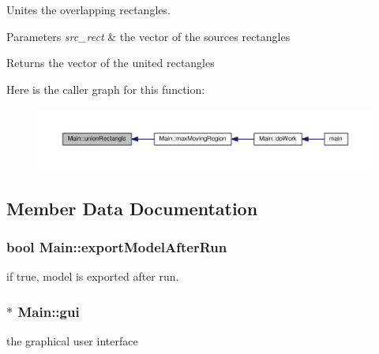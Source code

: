 Unites the overlapping rectangles. 


\begin{DoxyParams}{Parameters}
{\em src\-\_\-rect} & the vector of the sources rectangles \\
\hline
\end{DoxyParams}
\begin{DoxyReturn}{Returns}
the vector of the united rectangles 
\end{DoxyReturn}


Here is the caller graph for this function\-:\nopagebreak
\begin{figure}[H]
\begin{center}
\leavevmode
\includegraphics[width=350pt]{classMain_a5d36ac4bd55c63eae9b37d194a6017ce_icgraph}
\end{center}
\end{figure}




\subsection{Member Data Documentation}
\hypertarget{classMain_a9a760d7b7e2dc8dc9bdaa027a86da734}{
\subsubsection[{export\-Model\-After\-Run}]{\setlength{\rightskip}{0pt plus 5cm}bool Main\-::export\-Model\-After\-Run}}\label{classMain_a9a760d7b7e2dc8dc9bdaa027a86da734}


if true, model is exported after run. 

\hypertarget{classMain_a56afdbd63fd6e0f92ed2113ad53cc8df}{
\subsubsection[{gui}]{$\ast$ Main\-::gui}}\label{classMain_a56afdbd63fd6e0f92ed2113ad53cc8df}


the graphical user interface 

